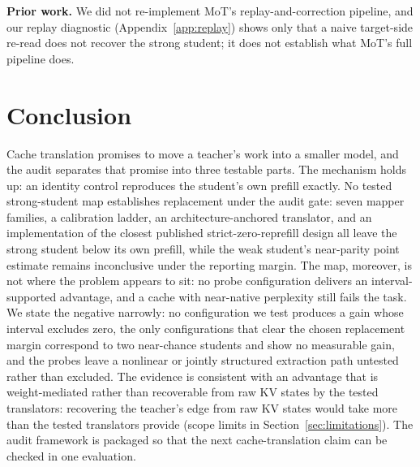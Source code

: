 \documentclass[10pt]{article}
\begin{document}
\textbf{Prior work.} We did not re-implement MoT's replay-and-correction
pipeline, and our replay diagnostic (Appendix~\ref{app:replay}) shows only that
a naive target-side re-read does not recover the strong student; it does not
establish what MoT's full pipeline does.

\section{Conclusion}
Cache translation promises to move a teacher's work into a smaller model,
and the audit separates that promise into three testable parts. The
mechanism holds up: an identity control reproduces the student's own prefill
exactly. No tested strong-student map establishes replacement under the audit gate: seven mapper families, a
calibration ladder, an architecture-anchored translator, and an implementation
of the closest published strict-zero-reprefill design all leave the strong student below its own
prefill, while the weak student's near-parity point estimate remains
inconclusive under the reporting margin. The map, moreover, is not where the
problem appears to sit: no probe configuration delivers an interval-supported
advantage, and a cache with near-native perplexity still fails the
task. We state the negative narrowly: no configuration we test produces a gain
whose interval excludes zero, the only configurations that clear the chosen replacement margin correspond to two near-chance
students and show no measurable gain, and the probes leave
a nonlinear or jointly structured extraction path untested rather than
excluded. The evidence is consistent with an advantage that is weight-mediated
rather than recoverable from raw KV states by the tested translators:
recovering the teacher's edge from raw KV states would take
more than the tested translators provide (scope limits in
Section~\ref{sec:limitations}). The audit framework is
packaged so that the next cache-translation claim can be checked in one
evaluation.




\appendix
\end{document}
